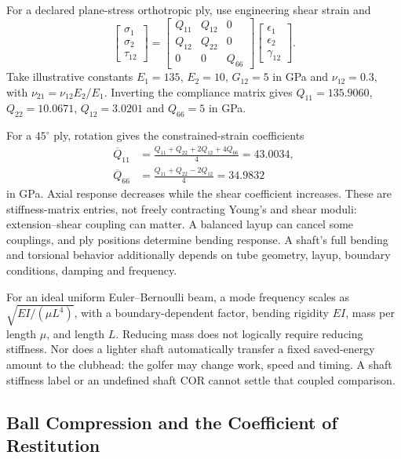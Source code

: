 For a declared plane-stress orthotropic ply, use engineering shear strain and
\[
\begin{bmatrix}\sigma_1\\\sigma_2\\\tau_{12}\end{bmatrix}
=
\begin{bmatrix}Q_{11}&Q_{12}&0\\Q_{12}&Q_{22}&0\\0&0&Q_{66}\end{bmatrix}
\begin{bmatrix}\epsilon_1\\\epsilon_2\\\gamma_{12}\end{bmatrix}.
\]
Take illustrative constants $E_1=135$, $E_2=10$, $G_{12}=5$ in GPa and $\nu_{12}=0.3$, with $\nu_{21}=\nu_{12}E_2/E_1$. Inverting the compliance matrix gives $Q_{11}=135.9060$, $Q_{22}=10.0671$, $Q_{12}=3.0201$ and $Q_{66}=5$ in GPa.

For a $45^\circ$ ply, rotation gives the constrained-strain coefficients
\[
\begin{aligned}
\overline Q_{11}&=\frac{Q_{11}+Q_{22}+2Q_{12}+4Q_{66}}4=43.0034,\\
\overline Q_{66}&=\frac{Q_{11}+Q_{22}-2Q_{12}}4=34.9832
\end{aligned}
\]
in GPa. Axial response decreases while the shear coefficient increases. These are stiffness-matrix entries, not freely contracting Young's and shear moduli: extension--shear coupling can matter. A balanced layup can cancel some couplings, and ply positions determine bending response. A shaft's full bending and torsional behavior additionally depends on tube geometry, layup, boundary conditions, damping and frequency.

For an ideal uniform Euler--Bernoulli beam, a mode frequency scales as $\sqrt{EI/(\mu L^4)}$, with a boundary-dependent factor, bending rigidity $EI$, mass per length $\mu$, and length $L$. Reducing mass does not logically require reducing stiffness. Nor does a lighter shaft automatically transfer a fixed saved-energy amount to the clubhead: the golfer may change work, speed and timing. A shaft stiffness label or an undefined shaft COR cannot settle that coupled comparison.

\subsection{Ball Compression and the Coefficient of Restitution}
\label{ex:ch13:ball_fitting}

